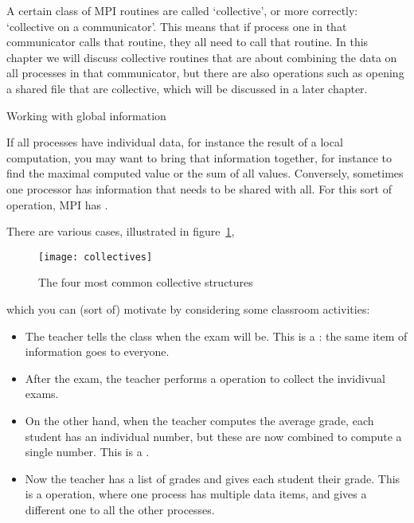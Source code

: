 
A certain class of MPI routines are called `collective', or more correctly:
`collective on a communicator'.
This means that if process one in that communicator calls that routine,
they all need to call that routine.
In this chapter we will discuss collective routines
that are about combining the data on all processes
in that communicator,
but there are also operations such as opening a shared file
that are collective, which will be discussed in a later chapter.

 {Working with global information}
\label{sec:collective}

If all processes have individual data, for instance the result
of a local computation, you may want to bring that information
together, for instance to find the maximal computed value
or the sum of all values. Conversely, sometimes one processor has
information that needs to be shared with all.
For this sort of operation, MPI
has .

There are various cases, illustrated in figure~\ref{fig:collectives},
\begin{figure}[ht]
  \texttt{[image: collectives]}
  \caption{The four most common collective structures}
  \label{fig:collectives}
\end{figure}
which you can (sort of) motivate by considering some classroom activities:
\begin{itemize}
\item The teacher tells the class when the exam will be. This is a
  : the same item of information goes to everyone.
\item After the exam, the teacher performs a 
  operation to collect the invidivual exams.
\item On the other hand, when the teacher computes the average grade,
  each student has an individual number, but these are now combined to
  compute a single number. This is a .
\item Now the teacher has a list of grades and gives each student their
  grade. This is a  operation, where one process
  has multiple data items, and gives a different one to all the other
  processes.
\end{itemize}

